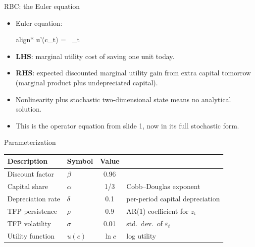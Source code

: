\documentclass[aspectratio=169,10pt]{beamer}
\newcommand{\emphcolor}[1]{\textbf{\textcolor{emphcolorval}{#1}}}
\begin{document}
\begin{frame}{RBC: the Euler equation}
	\begin{itemize}
		\item Euler equation:
		\begin{empheq}[box=\tcbhighmath]{align*}
			u'(c_t) = \beta\, _t\!
		\end{empheq}
		\item \emphcolor{LHS}: marginal utility cost of saving one unit today.
		\item \emphcolor{RHS}: expected discounted marginal utility gain from extra capital tomorrow (marginal product plus undepreciated capital).
		\item Nonlinearity plus stochastic two-dimensional state means no analytical solution.
		\item This is the operator equation from slide 1, now in its full stochastic form.
	\end{itemize}
\end{frame}

\begin{frame}{Parameterization}
	\vspace{0.2in}
	\begin{center}
		\begin{tabular}{llcl}
			\toprule
			Description & Symbol & Value & \\
			\midrule
			Discount factor   & $\beta$  & \textcolor{emphcolorval}{0.96} & \\
			Capital share     & $\alpha$ & \textcolor{emphcolorval}{1/3}  & Cobb--Douglas exponent \\
			Depreciation rate & $\delta$ & \textcolor{emphcolorval}{0.1}  & per-period capital depreciation \\
			TFP persistence   & $\rho$   & \textcolor{emphcolorval}{0.9}  & AR(1) coefficient for $z_t$ \\
			TFP volatility    & $\sigma$ & \textcolor{emphcolorval}{0.01} & std.\ dev.\ of $\varepsilon_t$ \\
			Utility function  & $u(c)$   & \textcolor{emphcolorval}{$\ln c$} & log utility \\
			\bottomrule
		\end{tabular}
	\end{center}
\end{frame}
\end{document}
